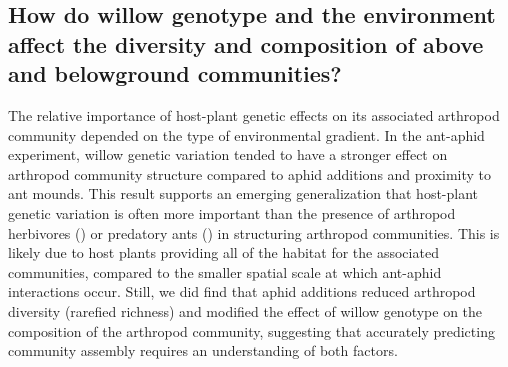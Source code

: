 \documentclass[11pt]{article}
\begin{document}

\subsection*{How do willow genotype and the environment affect the diversity and composition of above and belowground communities?}


The relative importance of host-plant genetic effects on its associated arthropod community depended on the type of environmental gradient. In the ant-aphid experiment, willow genetic variation tended to have a stronger effect on arthropod community structure compared to aphid additions and proximity to ant mounds. This result supports an emerging generalization that host-plant genetic variation is often more important than the presence of arthropod herbivores (\citealt{Johnson_2008, McGuire2007, Fritz1986, Cronin2001}) or predatory ants (\citealt{Abdala_Roberts_2012, Mooney_2008, Johnson_2008}) in structuring arthropod communities. This is likely due to host plants providing all of the habitat for the associated communities, compared to the smaller spatial scale at which ant-aphid interactions occur. Still, we did find that aphid additions reduced arthropod diversity (rarefied richness) and modified the effect of willow genotype on the composition of the arthropod community, suggesting that accurately predicting community assembly requires an understanding of both factors. 
\end{document}
